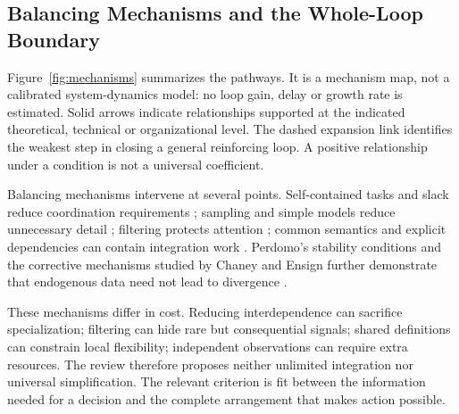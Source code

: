 \documentclass[journal]{IEEEtran}
\begin{document}
\subsection{Balancing Mechanisms and the Whole-Loop Boundary}
Figure~\ref{fig:mechanisms} summarizes the pathways. It is a mechanism map, not a calibrated system-dynamics model: no loop gain, delay or growth rate is estimated. Solid arrows indicate relationships supported at the indicated theoretical, technical or organizational level. The dashed expansion link identifies the weakest step in closing a general reinforcing loop. A positive relationship under a condition is not a universal coefficient.

Balancing mechanisms intervene at several points. Self-contained tasks and slack reduce coordination requirements \cite{GALBRAITH1974}; sampling and simple models reduce unnecessary detail \cite{gorry1971,little1969}; filtering protects attention \cite{SIMON1971}; common semantics and explicit dependencies can contain integration work \cite{chaudhuri1997,sculley2015}. Perdomo's stability conditions and the corrective mechanisms studied by Chaney and Ensign further demonstrate that endogenous data need not lead to divergence \cite{perdomo2020,chaney2018,ensign2018}.

These mechanisms differ in cost. Reducing interdependence can sacrifice specialization; filtering can hide rare but consequential signals; shared definitions can constrain local flexibility; independent observations can require extra resources. The review therefore proposes neither unlimited integration nor universal simplification. The relevant criterion is fit between the information needed for a decision and the complete arrangement that makes action possible.
\end{document}
